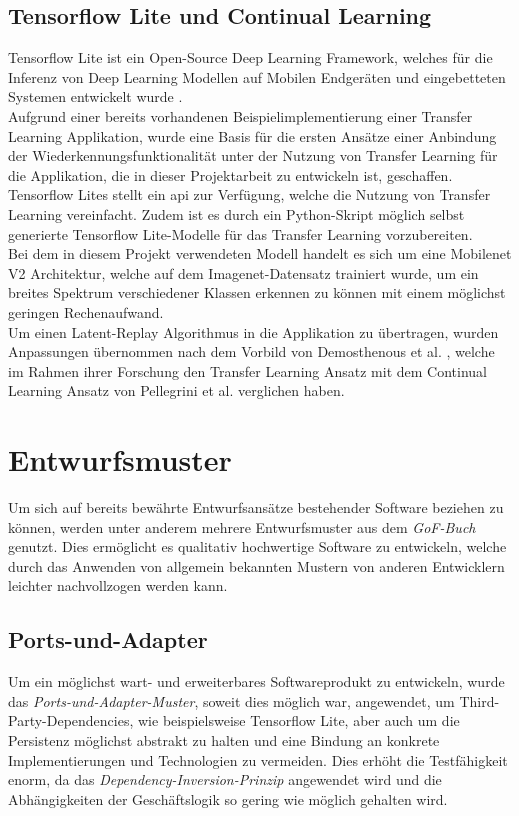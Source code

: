 \documentclass[oneside]{ausarbeitung}
\begin{document}
\subsection{Tensorflow Lite und Continual Learning}
Tensorflow Lite ist ein Open-Source Deep Learning Framework, welches für die Inferenz von Deep Learning Modellen auf Mobilen Endgeräten und eingebetteten Systemen entwickelt wurde \cite{tflite-site}.\\
Aufgrund einer bereits vorhandenen Beispielimplementierung einer Transfer Learning Applikation, wurde eine Basis für die ersten Ansätze einer Anbindung der Wiederkennungsfunktionalität unter der Nutzung von Transfer Learning für die Applikation, die in dieser Projektarbeit zu entwickeln ist, geschaffen.
Tensorflow Lites stellt ein \ac{api} zur Verfügung, welche die Nutzung von Transfer Learning vereinfacht. Zudem ist es durch ein Python-Skript möglich selbst generierte Tensorflow Lite-Modelle für das Transfer Learning vorzubereiten.\\
Bei dem in diesem Projekt verwendeten Modell handelt es sich um eine Mobilenet V2 Architektur, welche auf dem Imagenet-Datensatz trainiert wurde, um ein breites Spektrum verschiedener Klassen erkennen zu können mit einem möglichst geringen Rechenaufwand.\\
Um einen Latent-Replay Algorithmus in die Applikation zu übertragen, wurden Anpassungen übernommen nach dem Vorbild von Demosthenous et al. \cite{cl-vs-tl}, welche im Rahmen ihrer Forschung den Transfer Learning Ansatz mit dem Continual Learning Ansatz von Pellegrini et al. \cite{Pellegrini2019} verglichen haben.
\section{Entwurfsmuster}
Um sich auf bereits bewährte Entwurfsansätze bestehender Software beziehen zu können, werden unter anderem mehrere Entwurfsmuster aus dem \textit{GoF-Buch} genutzt. Dies ermöglicht es qualitativ hochwertige Software zu entwickeln, welche durch das Anwenden von allgemein bekannten Mustern von anderen Entwicklern leichter nachvollzogen werden kann.
\subsection{Ports-und-Adapter}
Um ein möglichst wart- und erweiterbares Softwareprodukt zu entwickeln, wurde das \textit{Ports-und-Adapter-Muster}, soweit dies möglich war, angewendet, um Third-Party-Dependencies, wie beispielsweise Tensorflow Lite, aber auch um die Persistenz möglichst abstrakt zu halten und eine Bindung an konkrete Implementierungen und Technologien zu vermeiden. Dies erhöht die Testfähigkeit enorm, da das \textit{Dependency-Inversion-Prinzip} angewendet wird und die Abhängigkeiten der Geschäftslogik so gering wie möglich gehalten wird.
\end{document}
